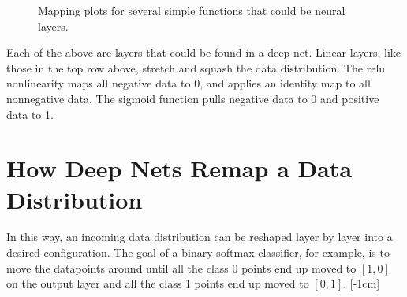 \begin{figure}[h]
\begin{minipage}[t][5.0cm][c]{0.45\textwidth}
    \end{minipage}
    \caption{Mapping plots for several simple functions that could be neural layers.}
    \label{fig:neural_nets_as_distribution_transformers:new_way_plot_examples}
\end{figure}

Each of the above are layers that could be found in a deep net. Linear layers, like those in the top row above, stretch and squash the data distribution. The relu nonlinearity maps all negative data to 0, and applies an identity map to all nonnegative data. The sigmoid function pulls negative data to 0 and positive data to 1.

\section{How Deep Nets Remap a Data Distribution}
In this way, an incoming data distribution can be reshaped layer by layer into a desired configuration. The goal of a binary softmax classifier, for example, is to move the datapoints around until all the class 0 points end up moved to $[1,0]$ on the output layer and all the class 1 points end up moved to $[0,1]$.
[-1cm]

